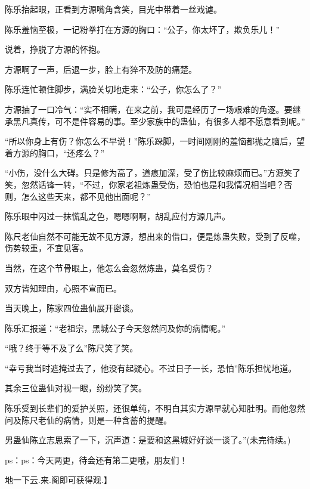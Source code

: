 \begin{this_body}
陈乐抬起眼，正看到方源嘴角含笑，目光中带着一丝戏谑。

陈乐羞恼至极，一记粉拳打在方源的胸口：“公子，你太坏了，欺负乐儿！”

说着，挣脱了方源的怀抱。

方源啊了一声，后退一步，脸上有猝不及防的痛楚。

陈乐连忙顿住脚步，满脸关切地走来：“公子，你怎么了？”

方源抽了一口冷气：“实不相瞒，在来之前，我可是经历了一场艰难的角逐。要继承黑凡真传，可不是件容易的事。至少家族中的蛊仙，有很多人都不愿意看到呢。”

“所以你身上有伤？你怎么不早说！”陈乐跺脚，一时间刚刚的羞恼都抛之脑后，望着方源的胸口，“还疼么？”

“小伤，没什么大碍。只是修为高了，道痕加深，受了伤比较麻烦而已。”方源笑了笑，忽然话锋一转，“不过，你家老祖炼蛊受伤，恐怕也是和我情况相当吧？否则，怎么这些天来，都不见他出面呢？”

陈乐眼中闪过一抹慌乱之色，嗯嗯啊啊，胡乱应付方源几声。

陈尺老仙自然不可能无故不见方源，想出来的借口，便是炼蛊失败，受到了反噬，伤势较重，不宜见客。

当然，在这个节骨眼上，他怎么会忽然炼蛊，莫名受伤？

双方皆知理由，心照不宣而已。

当天晚上，陈家四位蛊仙展开密谈。

陈乐汇报道：“老祖宗，黑城公子今天忽然问及你的病情呢。”

“哦？终于等不及了么”陈尺笑了笑。

“幸亏我当时遮掩过去了，他没有起疑心。不过日子一长，恐怕”陈乐担忧地道。

其余三位蛊仙对视一眼，纷纷笑了笑。

陈乐受到长辈们的爱护关照，还很单纯，不明白其实方源早就心知肚明。而他忽然问及陈尺老仙的病情，则是一种含蓄的提醒。

男蛊仙陈立志思索了一下，沉声道：是要和这黑城好好谈一谈了。”(未完待续。)

ps：ps：今天两更，待会还有第二更哦，朋友们！

地一下云.来.阁即可获得观.】

\end{this_body}


